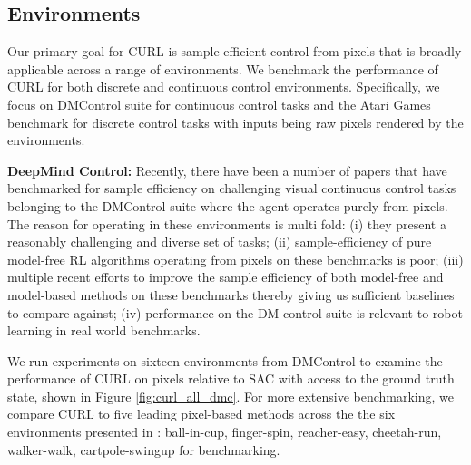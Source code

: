 \documentclass{article}
\begin{document}
\begin{table*}[h!]
\begin{center}
\begin{small}
\begin{sc}
\begin{tabular}{lccccccc}
\bottomrule
\end{tabular}
\end{sc}
\end{small}
\end{center}
\vskip -0.1in
\end{table*}


\subsection{Environments}

Our primary goal for CURL is sample-efficient control from pixels that is broadly applicable across a range of environments. We benchmark the performance of CURL for both discrete and continuous control environments. Specifically, we focus on DMControl suite for continuous control tasks and the Atari Games benchmark for discrete control tasks with inputs being raw pixels rendered by the environments.

\textbf{DeepMind Control:} Recently, there have been a number of papers that have benchmarked for sample efficiency on challenging visual continuous control tasks belonging to the DMControl suite \cite{tassa2018deepmind} where the agent operates purely from pixels. The reason for operating in these environments is multi fold: (i) they present a reasonably challenging and diverse set of tasks; (ii) sample-efficiency of pure model-free RL algorithms operating from pixels on these benchmarks is poor; (iii) multiple recent efforts to improve the sample efficiency of both model-free and model-based methods on these benchmarks thereby giving us sufficient baselines to compare against; (iv) performance on the DM control suite is relevant to robot learning in real world benchmarks.

We run experiments on sixteen environments from DMControl to examine the performance of CURL on pixels relative to SAC with access to the ground truth state, shown in Figure \ref{fig:curl_all_dmc}. For more extensive benchmarking, we compare CURL to five leading pixel-based methods across the the six environments presented in \citet{yarats2019improving}: ball-in-cup, finger-spin, reacher-easy, cheetah-run, walker-walk, cartpole-swingup for benchmarking. 
\end{document}

